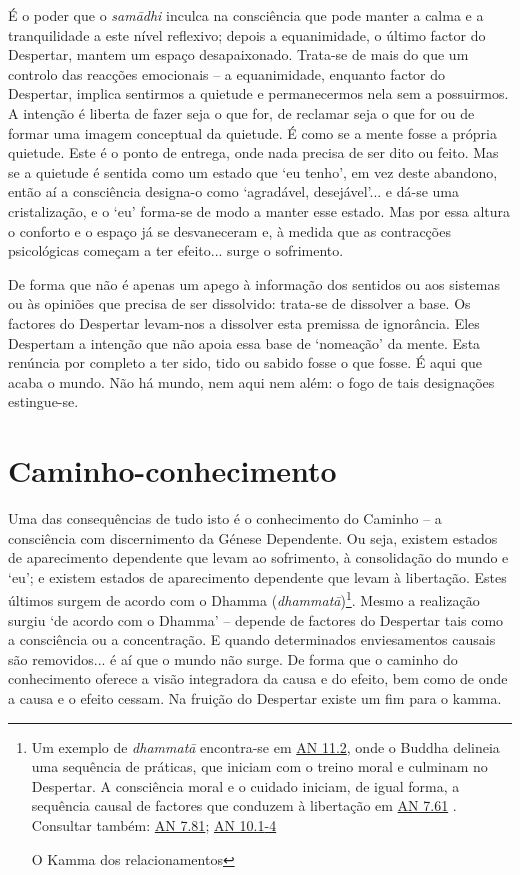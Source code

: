 É o poder que o \emph{samādhi} inculca na consciência que pode manter a calma e a tranquilidade a este nível reflexivo; depois a equanimidade, o último factor do Despertar, mantem um espaço desapaixonado. Trata-se de mais do que um controlo das reacções emocionais -- a equanimidade, enquanto factor do Despertar, implica sentirmos a quietude e permanecermos nela sem a possuirmos. A intenção é liberta de fazer seja o que for, de reclamar seja o que for ou de formar uma imagem conceptual da quietude. É como se a mente fosse a própria quietude. Este é o ponto de entrega, onde nada precisa de ser dito ou feito. Mas se a quietude é sentida como um estado que `eu tenho', em vez deste abandono, então aí a consciência designa-o como `agradável, desejável'... e dá-se uma cristalização, e o `eu' forma-se de modo a manter esse estado. Mas por essa altura o conforto e o espaço já se desvaneceram e, à medida que as contracções psicológicas começam a ter efeito... surge o sofrimento.

De forma que não é apenas um apego à informação dos sentidos ou aos sistemas ou às opiniões que precisa de ser dissolvido: trata-se de dissolver a base. Os factores do Despertar levam-nos a dissolver esta premissa de ignorância. Eles Despertam a intenção que não apoia essa base de `nomeação' da mente. Esta renúncia por completo a ter sido, tido ou sabido fosse o que fosse. É aqui que acaba o mundo. Não há mundo, nem aqui nem além: o fogo de tais designações estingue-se.

\section{Caminho-conhecimento}

Uma das consequências de tudo isto é o conhecimento do Caminho -- a consciência com discernimento da Génese Dependente. Ou seja, existem estados de aparecimento dependente que levam ao sofrimento, à consolidação do mundo e `eu'; e existem estados de aparecimento dependente que levam à libertação. Estes últimos surgem de acordo com o Dhamma (\emph{dhammatā})\footnote{Um exemplo de \emph{dhammatā} encontra-se em \href{https://suttacentral.net/an11.2/en/thanissaro}{AN 11.2}, onde o Buddha delineia uma sequência de práticas, que iniciam com o treino moral e culminam no Despertar. A consciência moral e o cuidado iniciam, de igual forma, a sequência causal de factores que conduzem à libertação em \href{https://suttacentral.net/an7.65/en/sujato}{AN 7.61} . Consultar também: \href{https://suttacentral.net/an7.81/en/sujato}{AN 7.81}; \href{https://suttacentral.net/an10.1/en/bodhi}{AN 10.1}\href{https://suttacentral.net/an10.2/en/bodhi}{-4}

  O Kamma dos relacionamentos}. Mesmo a realização surgiu `de acordo com o Dhamma' -- depende de factores do Despertar tais como a consciência ou a concentração. E quando determinados enviesamentos causais são removidos... é aí que o mundo não surge. De forma que o caminho do conhecimento oferece a visão integradora da causa e do efeito, bem como de onde a causa e o efeito cessam. Na fruição do Despertar existe um fim para o kamma.

